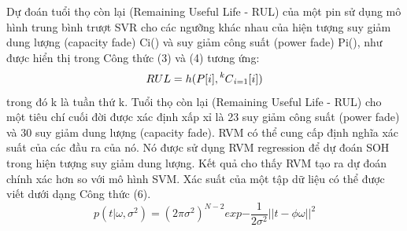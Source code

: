 \documentclass[a4paper,11pt]{article}
\newcommand\Mycomb[2][^n]{\prescript{#1\mkern-0.5mu}{}C_{#2}}
\theoremstyle{mytheor}
\begin{document}
Dự đoán tuổi thọ còn lại (Remaining Useful Life - RUL) của một pin sử dụng mô hình trung bình trượt SVR cho các ngưỡng khác nhau của hiện tượng suy giảm dung lượng (capacity fade) Ci() và suy giảm công suất (power fade) Pi(), như được hiển thị trong Công thức (3) và (4) tương ứng:\\
\[RUL = h(P[i],\Mycomb[k]{i=1}[i]) \]
trong đó k là tuần thứ k. Tuổi thọ còn lại (Remaining Useful Life - RUL) cho một tiêu chí cuối đời được xác định xấp xỉ là 23 suy giảm công suất (power fade) và 30 suy giảm dung lượng (capacity fade).
RVM có thể cung cấp định nghĩa xác suất của các đầu ra của nó. Nó được sử dụng RVM regression để dự đoán SOH trong hiện tượng suy giảm dung lượng. Kết quả cho thấy RVM tạo ra dự đoán chính xác hơn so với mô hình SVM. Xác suất của một tập dữ liệu có thể được viết dưới dạng Công thức (6).\\

\[p(t|\omega, \sigma^2) = (2\pi\sigma^2)^{N-2} exp{- \frac{1}{2\sigma^2}||t -\phi\omega||^2}  \]
\end{document}
